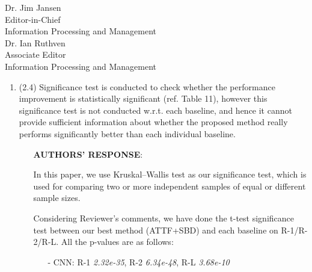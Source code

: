 \documentclass[11pt]{letter} %
\begin{document}
\begin{letter}{Dr. Jim Jansen \\
			Editor-in-Chief  \\
			Information Processing and Management\\
			Dr. Ian Ruthven \\
			Associate Editor \\
			Information Processing and Management}
\begin{enumerate}
\begin{itemize}
\begin{itemize}
				\item[-] For Spearman rank coefficient,
				\begin{equation}
			    \nonumber
				\rho = \frac{\sum_{i=1}^{n}(R(x_i) - \overline{R(X)})(R(y_i) - \overline{R(Y)})}
					  {\sqrt{\sum_{i=1}^{n}(R(x_i) - \overline{R(X)})^{2}
					  \cdot\sum_{i=1}^{n}(R(y_i)-\overline{R(Y)})^{2}}}
				\end{equation}
				where $R(x_i)$ and $R(y_i)$ are the rank of $x_i$ and $y_i$.
				$\overline{R(X)}$ and $\overline{R(Y)}$ are the mean rank of $X$ and $Y$.
				\item[-] For kendall's tau coefficient,
				\begin{equation}
				\tau = \frac{n_c - n_d}{n_c + n_d} = \frac{n_c - n_d}{n(n-1)/2} \nonumber
				\end{equation}
				where $n_c$ is the number of \textit{concordant} pairs.
				$n_d$ is the number of \textit{discordant} pairs.
				Any pair of total repeatedness scores $(x_{i},y_{i})$ and $(x_{j},y_{j})$, where $i<j$.
				They are said to be \textit{concordant},
				if both $x_{i}>x_{j}$ and $y_{i}>y_{j}$; or if both $x_{i}<x_{j}$ and $y_{i}<y_{j}$.
				They are said to be discordant, if $x_{i}>x_{j}$ and $y_{i}<y_{j}$; 
				or if $x_{i}<x_{j}$ and $y_{i}>y_{j}$. 
				If $x_{i}=x_{j}$ or $y_{i}=y_{j}$, the pair is neither concordant nor discordant.
				\end{itemize}
				''
			\end{itemize}
			\item 
			(2.4) Significance test is conducted to check whether the performance improvement is statistically significant (ref. Table 11), however this significance test is not conducted w.r.t. each baseline, and hence it cannot provide sufficient information about whether the proposed method really performs significantly better than each individual baseline.
			\begin{itemize}
				\item[] \textbf{AUTHORS' RESPONSE}: 
				
				In this paper, we use Kruskal–Wallis test as our significance test, 
		        which is used for comparing two or more independent samples 
				of equal or different sample sizes.

                \hspace*{0.6cm} 
				Considering Reviewer's comments, we have done the t-test significance test between 
				our best method (ATTF+SBD) and each baseline on R-1/R-2/R-L.
				All the p-values are as follows: 
			    \begin{itemize}	
				\item[-] CNN:  R-1 \textit{2.32e-35}, R-2 \textit{6.34e-48}, R-L \textit{3.68e-10}
				

\end{itemize}
\end{itemize}
\end{enumerate}
\end{letter}
\end{document}
